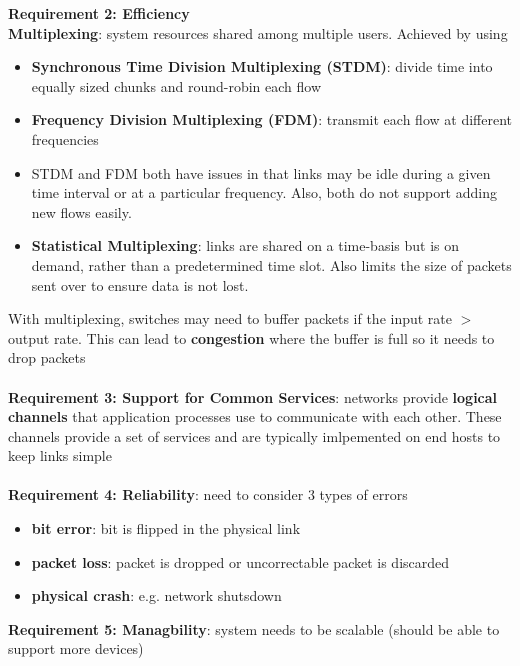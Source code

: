 \documentclass{article}
\begin{document}
  \textbf{Requirement 2: Efficiency} \\
  \textbf{Multiplexing}: system resources shared among multiple users. Achieved by using
    \begin{itemize}
      \item \textbf{Synchronous Time Division Multiplexing (STDM)}: divide time into equally sized chunks and round-robin each flow
      \item \textbf{Frequency Division Multiplexing (FDM)}: transmit each flow at different frequencies
      \item STDM and FDM both have issues in that links may be idle during a given time interval or at a particular frequency. Also, both do not support adding new flows easily.
      \item \textbf{Statistical Multiplexing}: links are shared on a time-basis but is on demand, rather than a predetermined time slot. Also limits the size of packets sent over to ensure data is not lost.
    \end{itemize}
    With multiplexing, switches may need to buffer packets if the input rate $>$ output rate. This can lead to \textbf{congestion} where the buffer is full so it needs to drop packets \\ \\
    \textbf{Requirement 3: Support for Common Services}: networks provide \textbf{logical channels} that application processes use to communicate with each other. These channels provide a set of services and are typically imlpemented on end hosts to keep links simple \\ \\
    \textbf{Requirement 4: Reliability}: need to consider 3 types of errors
    \begin{itemize}
      \item \textbf{bit error}: bit is flipped in the physical link
      \item \textbf{packet loss}: packet is dropped or uncorrectable packet is discarded
      \item \textbf{physical crash}: e.g. network shutsdown
    \end{itemize}
  \textbf{Requirement 5: Managbility}: system needs to be scalable (should be able to support more devices)
\end{document}
